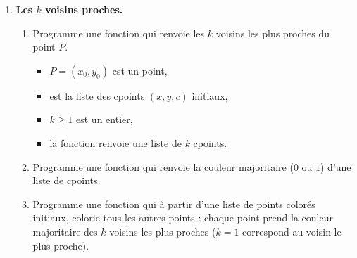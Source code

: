 \documentclass[10pt,class=report,crop=false]{standalone}
\begin{document}
\begin{activite}
\begin{enumerate}
	\item \textbf{Les $k$ voisins proches.}
	\begin{enumerate}
		\item Programme une fonction 
		qui renvoie les $k$ voisins les plus proches du point $P$.
		\begin{itemize}
			\item $P=(x_0,y_0)$ est un point,
			\item {} est la liste des cpoints $(x,y,c)$ initiaux,
			\item $k\ge1$ est un entier,
			\item la fonction renvoie une liste de $k$ cpoints.
		\end{itemize}  
		 
		\item Programme une fonction  qui renvoie la couleur majoritaire ($0$ ou $1$) d'une liste de cpoints.
		
		\item Programme une fonction  
		qui à partir d'une liste de points colorés initiaux, colorie tous les autres points : chaque point prend la couleur majoritaire des $k$ voisins les plus proches ($k=1$ correspond au voisin le plus proche).
		

\end{enumerate}
\end{enumerate}
\end{activite}
\end{document}
